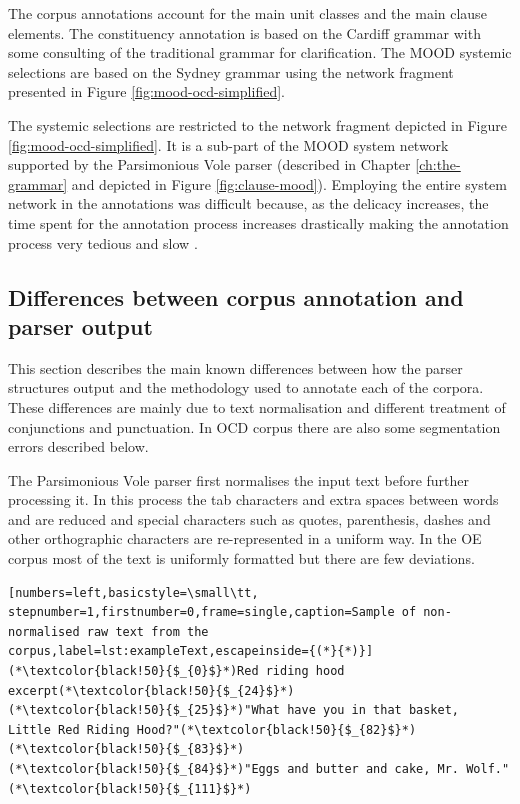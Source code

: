     The corpus annotations account for the main unit classes and the main clause elements. The constituency annotation is based on the Cardiff grammar \citep{Fawcett2008} with some consulting of the traditional grammar \citep{Quirk1985} for clarification. The MOOD systemic selections are based on the Sydney grammar \citep{Halliday2013} using the network fragment presented in Figure \ref{fig:mood-ocd-simplified}.
    
    The systemic selections are restricted to the network fragment depicted in Figure \ref{fig:mood-ocd-simplified}. It is a sub-part of the MOOD system network supported by the Parsimonious Vole parser (described in Chapter \ref{ch:the-grammar} and depicted in Figure \ref{fig:clause-mood}). Employing the entire system network in the annotations was difficult because, as the delicacy increases, the time spent for the annotation process increases drastically making the annotation process very tedious and slow \citep{mcenery2006corpus}.
    
\subsection{Differences between corpus annotation and parser output}
\label{sec:differences}

    This section describes the main known differences between how the parser structures output and the methodology used to annotate each of the corpora. These differences are mainly due to text normalisation and different treatment of conjunctions and punctuation. In OCD corpus there are also some segmentation errors described below.
    
    The Parsimonious Vole parser first normalises the input text before further processing it. In this process the tab characters and extra spaces between words and are reduced and special characters such as quotes, parenthesis, dashes and other orthographic characters are re-represented in a uniform way. In the OE corpus most of the text is uniformly formatted but there are few deviations. 
    
\begin{minipage}{\linewidth}
\begin{lstlisting}[numbers=left,basicstyle=\small\tt, stepnumber=1,firstnumber=0,frame=single,caption=Sample of non-normalised raw text from the corpus,label=lst:exampleText,escapeinside={(*}{*)}]
(*\textcolor{black!50}{$_{0}$}*)Red riding hood excerpt(*\textcolor{black!50}{$_{24}$}*)
(*\textcolor{black!50}{$_{25}$}*)"What have you in that basket,   Little Red Riding Hood?"(*\textcolor{black!50}{$_{82}$}*)
(*\textcolor{black!50}{$_{83}$}*)
(*\textcolor{black!50}{$_{84}$}*)"Eggs and butter and cake, Mr. Wolf."(*\textcolor{black!50}{$_{111}$}*)
\end{lstlisting}
\end{minipage}


